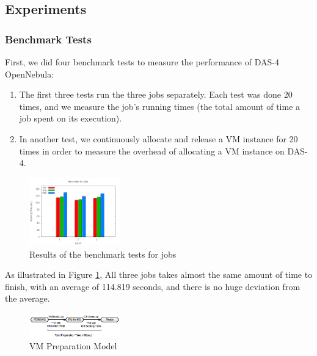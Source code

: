 \subsection{Experiments}

\subsubsection{Benchmark Tests}
First, we did four benchmark tests to measure the performance of DAS-4
OpenNebula:

\begin{enumerate}
\item The first three tests run the three jobs separately. Each
  test was done 20 times, and we measure the job's running times
  (the total amount of time a job spent on its execution).
\item In another test, we continuously allocate and release a VM
  instance for 20 times in order to measure the overhead of allocating
  a VM instance on DAS-4.
\end{enumerate}

\begin{figure}[!t]
\centering
\includegraphics[width=0.35\textwidth]{pictures/bench-jobs.png}
\caption{Results of the benchmark tests for jobs}
\label{figure_jobbenchmark}
\end{figure}

As illustrated in Figure \ref{figure_jobbenchmark}, All three jobs takes
almost the same amount of time to finish, with an average of 114.819 seconds, and there is no huge deviation from the average.

\begin{figure}
\centering
\includegraphics[width=0.35\textwidth]{pictures/vm-preparation-model.png}
\caption{VM Preparation Model}
\label{figure_vm_preparation_model}
\end{figure}

